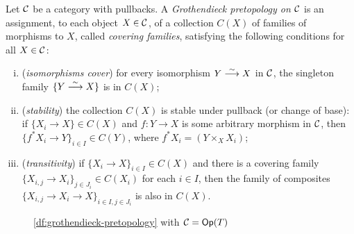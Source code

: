         \begin{definition}\label{df:grothendieck-pretopology}
            Let $\mathcal{C}$ be a category with pullbacks.
            A \emph{Grothendieck pretopology on $\mathcal{C}$} is an assignment, to each object $X\in\mathcal{C}$, of a collection $C(X)$ of families of morphisms to $X$, called \emph{covering families}, satisfying the following conditions for all $X\in\mathcal{C}$:
            \begin{enumerate}[(i)]
                \item (\emph{isomorphisms cover}) for every isomorphism $Y\overset{\sim}{\longrightarrow} X$ in $\mathcal{C}$, the singleton family $\{Y\overset{\sim}{\longrightarrow} X\}$ is in $C(X)$;
                \item (\emph{stability}) the collection $C(X)$ is stable under pullback (or change of base): if $\{X_i\to X\}\in C(X)$ and $f\colon Y\to X$ is some arbitrary morphism in $\mathcal{C}$, then $\{f^* X_i\to Y\}_{i\in I}\in C(Y)$, where $f^*X_i=(Y\times_X X_i)$;
                \item (\emph{transitivity}) if $\{X_i\to X\}_{i\in I}\in C(X)$ and there is a covering family $\{X_{i,j}\to X_i\}_{j\in J_i}\in C(X_i)$ for each $i\in I$, then the family of composites $\{X_{i,j}\to X_i\to X\}_{i\in I,j\in J_i}$ is also in $C(X)$.\qedhere
            \end{enumerate}
        \end{definition}

        \begin{figure}[h]
            \centering
            \caption{\cref{df:grothendieck-pretopology} with $\mathcal{C}=\mathsf{Op}(T)$}
            \label{fg:grothendieckpretopology}
        \end{figure}

